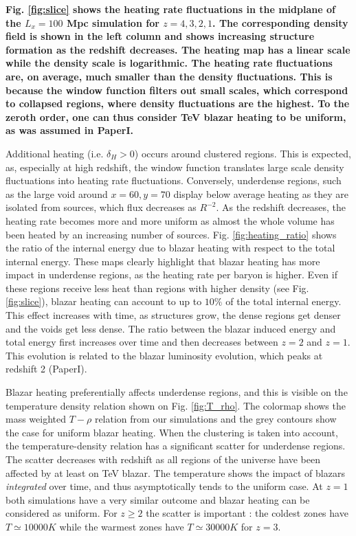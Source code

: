 \documentclass[twocolumns]{emulateapj}
\newcommand\ALc[1]{{\color{red} \bf #1}} %
\begin{document}
\ALc{Fig. \ref{fig:slice} shows the heating rate fluctuations in the midplane of the $L_x=100$ Mpc simulation for $z=4,3,2,1$.  The corresponding density field is shown in the left column and shows increasing structure formation as the redshift decreases.  The heating map has a linear scale while the density scale is logarithmic. The heating rate fluctuations are, on average, much smaller than the density fluctuations. This is because the window function filters out small scales, which correspond to collapsed regions,  where density fluctuations are the highest. To the zeroth order, one can thus consider TeV blazar heating to be uniform, as was assumed in PaperI.



Additional heating (i.e. $\delta_H>0$) occurs around clustered regions. This is expected, as, especially at high redshift, the window function translates large scale density fluctuations into heating rate fluctuations.  Conversely, underdense regions, such as the large void around $x=60,y=70$ display below average heating as they are isolated from sources, which flux decreases as $R^{-2}$. As the redshift decreases, the heating rate becomes more and more uniform as almost the whole volume has been heated by an increasing number of sources.
Fig. \ref{fig:heating_ratio} shows the ratio of the internal energy due to  blazar heating with respect to the total internal energy.  These maps clearly highlight that blazar heating has more impact in underdense regions, as the heating rate per baryon is higher. Even if these regions receive less heat than regions with higher density (see Fig. \ref{fig:slice}), blazar heating can account to up to $10\%$ of the total internal energy.  This effect increases with time, as structures grow, the dense regions get denser and the voids get less dense. The ratio between the blazar induced energy and total energy first increases over time and then decreases between $z=2$ and $z=1$.  This evolution is related to the blazar luminosity evolution, which peaks at redshift 2 (PaperI).


Blazar heating preferentially affects underdense regions, and this is visible on the temperature density relation shown on Fig. \ref{fig:T_rho}. The colormap shows the mass weighted $T-\rho$ relation from our simulations and the grey contours show the case for uniform blazar heating. When the clustering is taken into account, the temperature-density relation has a significant scatter for underdense regions. The scatter decreases with redshift as all regions of the universe have been affected by at least on TeV blazar. The temperature shows the impact of blazars \textit{integrated} over time, and thus asymptotically tends to the uniform case. At $z=1$ both simulations have a very similar outcome and blazar heating can be considered as uniform. For $z\geqslant 2$ the scatter is important :  the coldest zones have $T\simeq 10 000K$ while the warmest zones have $T\simeq 30 000K$ for $z=3$. 

}
\end{document}
